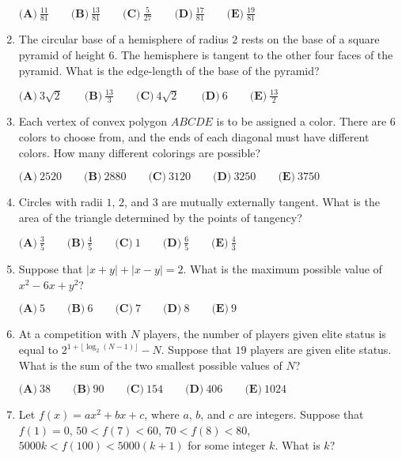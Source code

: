 \documentclass{article}
\begin{document}
\begin{enumerate}[label=\arabic*., itemsep=0.5em]
$
\textbf{(A)}\ \frac{11}{81} \qquad
\textbf{(B)}\ \frac{13}{81} \qquad
\textbf{(C)}\ \frac{5}{27} \qquad
\textbf{(D)}\ \frac{17}{81} \qquad
\textbf{(E)}\ \frac{19}{81} $\par \vspace{0.5em}\item The circular base of a hemisphere of radius $2$ rests on the base of a square pyramid of height $6$. The hemisphere is tangent to the other four faces of the pyramid. What is the edge-length of the base of the pyramid?

$
\textbf{(A)}\ 3\sqrt{2} \qquad
\textbf{(B)}\ \frac{13}{3} \qquad
\textbf{(C)}\ 4\sqrt{2} \qquad
\textbf{(D)}\ 6 \qquad
\textbf{(E)}\ \frac{13}{2} $\par \vspace{0.5em}\item Each vertex of convex polygon $ABCDE$ is to be assigned a color. There are $6$ colors to choose from, and the ends of each diagonal must have different colors. How many different colorings are possible?

$
\textbf{(A)}\ 2520 \qquad
\textbf{(B)}\ 2880 \qquad
\textbf{(C)}\ 3120 \qquad
\textbf{(D)}\ 3250 \qquad
\textbf{(E)}\ 3750 $\par \vspace{0.5em}\item Circles with radii $1$, $2$, and $3$ are mutually externally tangent. What is the area of the triangle determined by the points of tangency?

$
\textbf{(A)}\ \frac{3}{5} \qquad
\textbf{(B)}\ \frac{4}{5} \qquad
\textbf{(C)}\ 1 \qquad
\textbf{(D)}\ \frac{6}{5} \qquad
\textbf{(E)}\ \frac{4}{3} $\par \vspace{0.5em}\item Suppose that $\left|x+y\right|+\left|x-y\right|=2$. What is the maximum possible value of $x^2-6x+y^2$?

$
\textbf{(A)}\ 5 \qquad
\textbf{(B)}\ 6 \qquad
\textbf{(C)}\ 7 \qquad
\textbf{(D)}\ 8 \qquad
\textbf{(E)}\ 9 $\par \vspace{0.5em}\item At a competition with $N$ players, the number of players given elite status is equal to $2^{1+\lfloor \log_{2} (N-1) \rfloor}-N$. Suppose that $19$ players are given elite status. What is the sum of the two smallest possible values of $N$?

$
\textbf{(A)}\ 38 \qquad
\textbf{(B)}\ 90 \qquad
\textbf{(C)}\ 154 \qquad
\textbf{(D)}\ 406 \qquad
\textbf{(E)}\ 1024 $\par \vspace{0.5em}\item Let $f(x)=ax^2+bx+c$, where $a$, $b$, and $c$ are integers. Suppose that $f(1)=0$, $50<f(7)<60$, $70<f(8)<80$, $5000k<f(100)<5000(k+1)$ for some integer $k$. What is $k$?


\end{enumerate}
\end{document}
